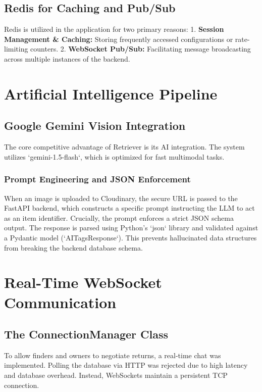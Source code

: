 \documentclass[12pt,a4paper]{report}
\begin{document}
\section{Redis for Caching and Pub/Sub}
Redis is utilized in the application for two primary reasons:
1. \textbf{Session Management \& Caching:} Storing frequently accessed configurations or rate-limiting counters.
2. \textbf{WebSocket Pub/Sub:} Facilitating message broadcasting across multiple instances of the backend.

\chapter{Artificial Intelligence Pipeline}
\section{Google Gemini Vision Integration}
The core competitive advantage of Retriever is its AI integration. The system utilizes `gemini-1.5-flash`, which is optimized for fast multimodal tasks.

\subsection{Prompt Engineering and JSON Enforcement}
When an image is uploaded to Cloudinary, the secure URL is passed to the FastAPI backend, which constructs a specific prompt instructing the LLM to act as an item identifier.
Crucially, the prompt enforces a strict JSON schema output. The response is parsed using Python's `json` library and validated against a Pydantic model (`AITagsResponse`). This prevents hallucinated data structures from breaking the backend database schema.

\chapter{Real-Time WebSocket Communication} 
\section{The ConnectionManager Class}
To allow finders and owners to negotiate returns, a real-time chat was implemented. Polling the database via HTTP was rejected due to high latency and database overhead. Instead, WebSockets maintain a persistent TCP connection.
\end{document}
